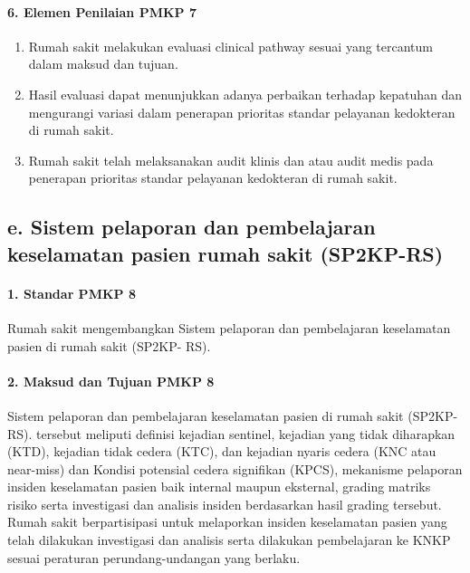 \documentclass[
]{book}
\providecommand{\tightlist}{%
  \setlength{\itemsep}{0pt}\setlength{\parskip}{0pt}}
\begin{document}
\hypertarget{elemen-penilaian-pmkp-7}{%
\paragraph*{6. Elemen Penilaian PMKP 7}\label{elemen-penilaian-pmkp-7}}

\begin{enumerate}
\def\labelenumi{\alph{enumi}.}
\tightlist
\item
  Rumah sakit melakukan evaluasi clinical pathway
  sesuai yang tercantum dalam maksud dan tujuan.
\item
  Hasil evaluasi dapat menunjukkan adanya perbaikan terhadap kepatuhan dan mengurangi variasi dalam penerapan prioritas standar pelayanan kedokteran di rumah sakit.
\item
  Rumah sakit telah melaksanakan audit klinis dan atau audit medis pada penerapan prioritas standar pelayanan kedokteran di rumah sakit.
\end{enumerate}

\hypertarget{e.-sistem-pelaporan-dan-pembelajaran-keselamatan-pasien-rumah-sakit-sp2kp-rs}{%
\subsection*{e. Sistem pelaporan dan pembelajaran keselamatan pasien rumah sakit (SP2KP-RS)}\label{e.-sistem-pelaporan-dan-pembelajaran-keselamatan-pasien-rumah-sakit-sp2kp-rs}}

\hypertarget{standar-pmkp-8}{%
\paragraph*{1. Standar PMKP 8}\label{standar-pmkp-8}}

Rumah sakit mengembangkan Sistem pelaporan dan pembelajaran keselamatan pasien di rumah sakit (SP2KP- RS).

\hypertarget{maksud-dan-tujuan-pmkp-8}{%
\paragraph*{2. Maksud dan Tujuan PMKP 8}\label{maksud-dan-tujuan-pmkp-8}}

Sistem pelaporan dan pembelajaran keselamatan pasien di rumah sakit (SP2KP-RS). tersebut meliputi definisi kejadian sentinel, kejadian yang tidak diharapkan (KTD), kejadian tidak cedera (KTC), dan kejadian nyaris cedera (KNC atau near-miss) dan Kondisi potensial cedera signifikan (KPCS), mekanisme pelaporan insiden keselamatan pasien baik internal maupun eksternal, grading matriks risiko serta investigasi dan analisis insiden berdasarkan hasil grading tersebut.
Rumah sakit berpartisipasi untuk melaporkan insiden keselamatan pasien yang telah dilakukan investigasi dan analisis serta dilakukan pembelajaran ke KNKP sesuai peraturan perundang-undangan yang berlaku.
\end{document}

